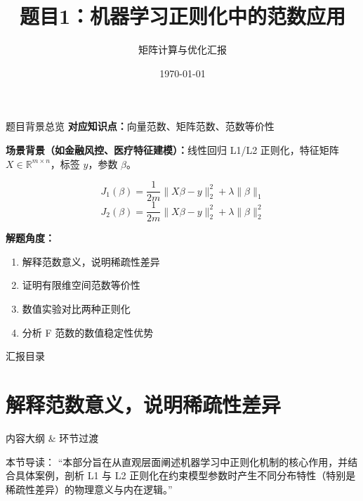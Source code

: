 \documentclass[aspectratio=169]{beamer}
\title{题目1：机器学习正则化中的范数应用}
\subtitle{矩阵计算与优化汇报}
\institute{智能科学与技术学院}
\date{\today}
\begin{document}
\begin{frame}
    \titlepage
\end{frame}

\begin{frame}{题目背景总览}
    \textbf{对应知识点：}向量范数、矩阵范数、范数等价性
    \vspace{0.3cm}
    
    \textbf{场景背景（如金融风控、医疗特征建模）：}线性回归 L1/L2 正则化，特征矩阵 $X \in \mathbb{R}^{m \times n}$，标签 $y$，参数 $\beta$。
    
    $$J_1(\beta) = \frac{1}{2m} \|X\beta - y\|_2^2 + \lambda \|\beta\|_1$$
    $$J_2(\beta) = \frac{1}{2m} \|X\beta - y\|_2^2 + \lambda \|\beta\|_2^2$$
    
    \vspace{0.3cm}
    \textbf{解题角度：}
    \begin{enumerate}
        \item 解释范数意义，说明稀疏性差异
        \item 证明有限维空间范数等价性
        \item 数值实验对比两种正则化
        \item 分析 F 范数的数值稳定性优势
    \end{enumerate}
\end{frame}

\begin{frame}{汇报目录}
    \tableofcontents
\end{frame}


\section{解释范数意义，说明稀疏性差异}

\begin{frame}{内容大纲 \& 环节过渡}
    \tableofcontents[currentsection]
    \vspace{0.5cm}
    \begin{block}{本节导读：}
        “本部分旨在从直观层面阐述机器学习中正则化机制的核心作用，并结合具体案例，剖析 L1 与 L2 正则化在约束模型参数时产生不同分布特性（特别是稀疏性差异）的物理意义与内在逻辑。”
    \end{block}
\end{frame}
\end{document}
